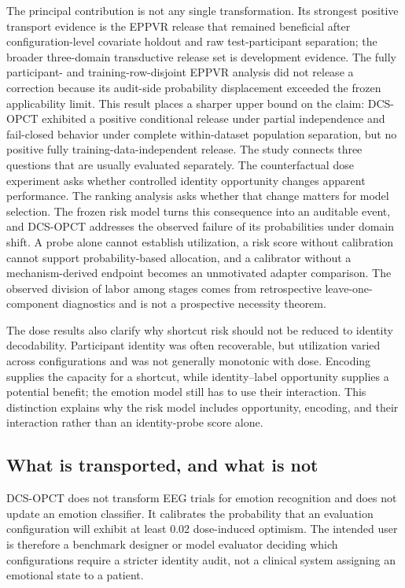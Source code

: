 \documentclass[preprint,12pt]{elsarticle}
\begin{document}
The principal contribution is not any single transformation. Its strongest positive transport evidence is the EPPVR release that remained beneficial after configuration-level covariate holdout and raw test-participant separation; the broader three-domain transductive release set is development evidence. The fully participant- and training-row-disjoint EPPVR analysis did not release a correction because its audit-side probability displacement exceeded the frozen applicability limit. This result places a sharper upper bound on the claim: DCS-OPCT exhibited a positive conditional release under partial independence and fail-closed behavior under complete within-dataset population separation, but no positive fully training-data-independent release. The study connects three questions that are usually evaluated separately. The counterfactual dose experiment asks whether controlled identity opportunity changes apparent performance. The ranking analysis asks whether that change matters for model selection. The frozen risk model turns this consequence into an auditable event, and DCS-OPCT addresses the observed failure of its probabilities under domain shift. A probe alone cannot establish utilization, a risk score without calibration cannot support probability-based allocation, and a calibrator without a mechanism-derived endpoint becomes an unmotivated adapter comparison. The observed division of labor among stages comes from retrospective leave-one-component diagnostics and is not a prospective necessity theorem.

The dose results also clarify why shortcut risk should not be reduced to identity decodability. Participant identity was often recoverable, but utilization varied across configurations and was not generally monotonic with dose. Encoding supplies the capacity for a shortcut, while identity--label opportunity supplies a potential benefit; the emotion model still has to use their interaction. This distinction explains why the risk model includes opportunity, encoding, and their interaction rather than an identity-probe score alone.

\subsection{What is transported, and what is not}

DCS-OPCT does not transform EEG trials for emotion recognition and does not update an emotion classifier. It calibrates the probability that an evaluation configuration will exhibit at least 0.02 dose-induced optimism. The intended user is therefore a benchmark designer or model evaluator deciding which configurations require a stricter identity audit, not a clinical system assigning an emotional state to a patient.
\end{document}
